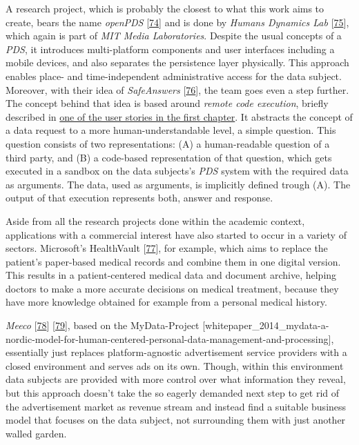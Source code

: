 \documentclass[12pt,english,a4paper,titlepage,cleardoublepage=empty,dottedtoc]{report}
\begin{document}
A research project, which is probably the closest to what this work aims
to create, bears the name \emph{openPDS}
{[}\protect\hyperlink{ref-paper_2012_openpds_on-trusted-use-of-large-scale-personal-data}{74}{]}
and is done by \emph{Humans Dynamics Lab}
{[}\protect\hyperlink{ref-web_mit_openpds-safeanswers-project-page}{75}{]},
which again is part of \emph{MIT Media Laboratories}. Despite the usual
concepts of a \emph{PDS}, it introduces multi-platform components and
user interfaces including a mobile devices, and also separates the
persistence layer physically. This approach enables place- and
time-independent administrative access for the data subject. Moreover,
with their idea of \emph{SafeAnswers}
{[}\protect\hyperlink{ref-paper_2014_openpds_protecting-privacy-of-meta-data-through-safeanswers}{76}{]},
the team goes even a step further. The concept behind that idea is based
around \emph{remote code execution}, briefly described in
\protect\hyperlink{header-applying-for-a-loan-and-checking-creditworthiness}{one
of the user stories in the first chapter}. It abstracts the concept of a
data request to a more human-understandable level, a simple question.
This question consists of two representations: (A) a human-readable
question of a third party, and (B) a code-based representation of that
question, which gets executed in a sandbox on the data subjects's
\emph{PDS} system with the required data as arguments. The data, used as
arguments, is implicitly defined trough (A). The output of that
execution represents both, answer and response.

Aside from all the research projects done within the academic context,
applications with a commercial interest have also started to occur in a
variety of sectors. Microsoft's HealthVault
{[}\protect\hyperlink{ref-web_microsoft_healthvault}{77}{]}, for
example, which aims to replace the patient's paper-based medical records
and combine them in one digital version. This results in a
patient-centered medical data and document archive, helping doctors to
make a more accurate decisions on medical treatment, because they have
more knowledge obtained for example from a personal medical history.

\emph{Meeco} {[}\protect\hyperlink{ref-web_meeco_how-it-works}{78}{]}
{[}\protect\hyperlink{ref-slides_2015_meeco-case-study}{79}{]}, based on
the MyData-Project
{[}whitepaper\_2014\_mydata-a-nordic-model-for-human-centered-personal-data-management-and-processing{]},
essentially just replaces platform-agnostic advertisement service
providers with a closed environment and serves ads on its own. Though,
within this environment data subjects are provided with more control
over what information they reveal, but this approach doesn't take the so
eagerly demanded next step to get rid of the advertisement market as
revenue stream and instead find a suitable business model that focuses
on the data subject, not surrounding them with just another walled
garden.
\end{document}
